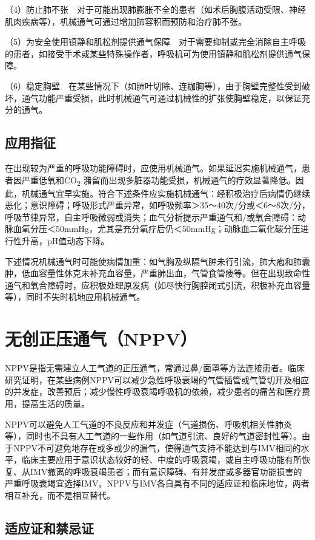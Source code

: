 （4）防止肺不张　对于可能出现肺膨胀不全的患者（如术后胸腹活动受限、神经肌肉疾病等），机械通气可通过增加肺容积而预防和治疗肺不张。

（5）为安全使用镇静和肌松剂提供通气保障　对于需要抑制或完全消除自主呼吸的患者，如接受手术或某些特殊操作者，呼吸机可为使用镇静和肌松剂提供通气保障。

（6）稳定胸壁　在某些情况下（如肺叶切除、连枷胸等），由于胸壁完整性受到破坏，通气功能严重受损，此时机械通气可通过机械性的扩张使胸壁稳定，以保证充分的通气。

\subsection{应用指征}

在出现较为严重的呼吸功能障碍时，应使用机械通气。如果延迟实施机械通气，患者因严重低氧和CO\textsubscript{2}
潴留而出现多脏器功能受损，机械通气的疗效显著降低。因此，机械通气宜早实施。符合下述条件应实施机械通气：经积极治疗后病情仍继续恶化；意识障碍；呼吸形式严重异常，如呼吸频率＞35～40次/分或＜6～8次/分，呼吸节律异常，自主呼吸微弱或消失；血气分析提示严重通气和/或氧合障碍：动脉血氧分压＜50mmHg，尤其是充分氧疗后仍＜50mmHg；动脉血二氧化碳分压进行性升高，pH值动态下降。

下述情况机械通气时可能使病情加重：如气胸及纵隔气肿未行引流，肺大疱和肺囊肿，低血容量性休克未补充血容量，严重肺出血，气管食管瘘等。但在出现致命性通气和氧合障碍时，应积极处理原发病（如尽快行胸腔闭式引流，积极补充血容量等），同时不失时机地应用机械通气。

\section{无创正压通气（NPPV）}

NPPV是指无需建立人工气道的正压通气，常通过鼻/面罩等方法连接患者。临床研究证明，在某些病例NPPV可以减少急性呼吸衰竭的气管插管或气管切开及相应的并发症，改善预后；减少慢性呼吸衰竭呼吸机的依赖，减少患者的痛苦和医疗费用，提高生活的质量。

NPPV可以避免人工气道的不良反应和并发症（气道损伤、呼吸机相关性肺炎等），同时也不具有人工气道的一些作用（如气道引流、良好的气道密封性等）。由于NPPV不可避免地存在或多或少的漏气，使得通气支持不能达到与IMV相同的水平，临床主要应用于意识状态较好的轻、中度的呼吸衰竭，或自主呼吸功能有所恢复、从IMV撤离的呼吸衰竭患者；而有意识障碍、有并发症或多器官功能损害的严重呼吸衰竭宜选择IMV。NPPV与IMV各自具有不同的适应证和临床地位，两者相互补充，而不是相互替代。

\subsection{适应证和禁忌证}

